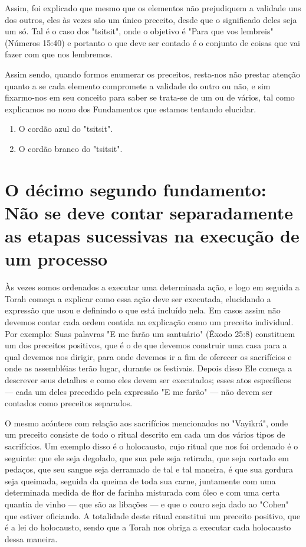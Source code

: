 \begin{itemize}
\begin{enumrate}
Assim, foi explicado que mesmo que os elementos não prejudiquem a
validade uns dos outros, eles às vezes são um único preceito, desde que
o significado deles seja um só. Tal é o caso dos "tsitsit", onde o
objetivo é "Para que vos lembreis" (Números 15:40) e portanto o que deve
ser contado é o con­junto de coisas que vai fazer com que nos lembremos.

Assim sendo, quando formos enumerar os preceitos, resta-nos não prestar
atenção quanto a se cada elemento compromete a validade do outro ou não,
e sim fixarmo-nos em seu conceito para saber se trata-se de um ou de
vários, tal como explicamos no nono dos Fundamentos que estamos tentando
elucidar.


\begin{enumerate}
\def\labelenumi{\arabic{enumi}.}
\setcounter{enumi}{20}
\item
 
 O cordão azul do "tsitsit".
 
\item
 
 O cordão branco do "tsitsit".
 
\end{enumerate}



\chapter{O décimo segundo fundamento: Não se deve contar separadamente as etapas sucessivas na execução de um processo}

Às vezes somos ordenados a executar uma determinada ação, e lo­go em
seguida a Torah começa a explicar como essa ação deve ser executada,
elucidando a expressão que usou e definindo o que está incluído nela. Em
casos assim não devemos contar cada ordem contida na explicação como um
preceito individual. Por exemplo: Suas palavras "E me farão um
santuário" (Êxodo 25:8) constituem um dos preceitos positivos, que é o
de que devemos construir uma casa para a qual devemos nos dirigir, para
onde devemos ir a fim de oferecer os sacrifícios e onde as assembléias
terão lugar, durante os festivais. Depois disso Ele começa a descrever
seus detalhes e como eles devem ser executados; esses atos específicos
--- cada um deles precedido pela expressão "E me farão" --- não devem
ser contados como preceitos separados.

O mesmo acóntece com relação aos sacrifícios mencionados no "Va­yikrá",
onde um preceito consiste de todo o ritual descrito em cada um dos
vários tipos de sacrifícios. Um exemplo disso é o holocausto, cujo
ritual que nos foi ordenado é o seguinte: que ele seja degolado, que sua
pele seja retirada, que seja cortado em pedaços, que seu sangue seja
derramado de tal e tal manei­ra, é que sua gordura seja queimada,
seguida da queima de toda sua carne, jun­tamente com uma determinada
medida de flor de farinha misturada com óleo e com uma certa quantia de
vinho --- que são as libações --- e que o couro seja dado ao "Cohen" que
estiver oficiando. A totalidade deste ritual constitui um preceito
positivo, que é a lei do holocausto, sendo que a Torah nos obriga a
executar cada holocausto dessa maneira.



\end{enumrate}
\end{itemize}
